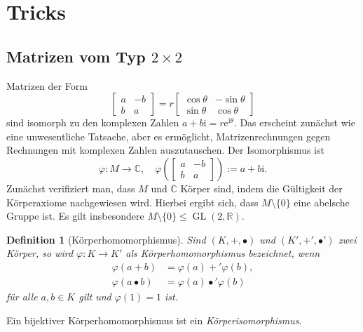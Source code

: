 \documentclass[a4paper,11pt,fleqn,twoside]{scrartcl}
\numberwithin{equation}{section}
\newcommand{\R}{\mathbb R}
\newcommand{\C}{\mathbb C}
\newcommand{\ui}{\mathrm i}
\newcommand{\ee}{\mathrm e}
\theoremstyle{rmbox}
\newtheorem{Definition}{Definition}
\begin{document}
\section{Tricks}
\subsection{Matrizen vom Typ $2\times 2$}
Matrizen der Form
\begin{equation}\label{eq:Drehstreckung}
\begin{bmatrix}
a & -b\\
b & a
\end{bmatrix} = r\begin{bmatrix}
\cos\theta & -\sin\theta\\
\sin\theta & \cos\theta
\end{bmatrix}
\end{equation}
sind isomorph zu den komplexen Zahlen $a+b\ui = r\ee^{\ui\theta}$.
Das erscheint
zunächst wie eine unwesentliche Tatsache, aber es ermöglicht,
Matrizenrechnungen gegen Rechnungen mit komplexen Zahlen
auszutauschen. Der Isomorphismus ist
\begin{equation}
\varphi\colon M\to\C,\quad
\varphi(\begin{bmatrix}
a & -b\\
b & a
\end{bmatrix}) := a+b\ui.
\end{equation}
Zunächst verifiziert man, dass $M$ und $\C$ Körper sind, indem
die Gültigkeit der Körperaxiome nachgewiesen wird. Hierbei ergibt
sich, dass $M\setminus\{0\}$ eine abelsche Gruppe ist. Es gilt
insbesondere $M\setminus\{0\}\le\operatorname{GL}(2,\R)$.

\begin{Definition}[Körperhomomorphismus]
Sind $(K,+,\bullet)$ und $(K',+',\bullet')$ zwei Körper, so wird
$\varphi\colon K\to K'$ als \emph{Körperhomomorphismus} bezeichnet,
wenn
\begin{align}
\varphi(a+b) &= \varphi(a)+'\varphi(b),\\
\varphi(a\bullet b) &= \varphi(a)\bullet'\varphi(b)
\end{align}
für alle $a,b\in K$ gilt und $\varphi(1)=1$ ist.
\end{Definition}
Ein bijektiver Körperhomomorphismus ist ein \emph{Körperisomorphismus}.
\end{document}
